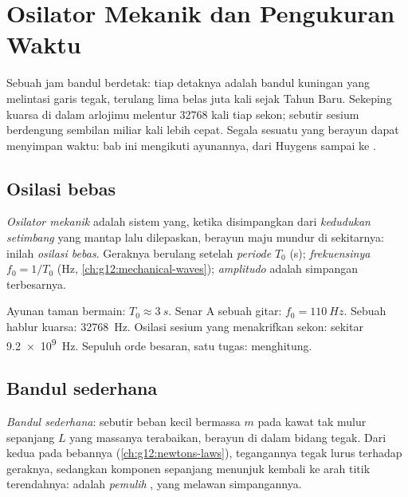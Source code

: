 \chapter{Osilator Mekanik dan Pengukuran Waktu}\label{ch:g12:oscillators-and-time}

Sebuah jam bandul berdetak: tiap detaknya adalah bandul kuningan yang
melintasi garis tegak, terulang lima belas juta kali sejak Tahun Baru.
Sekeping kuarsa di dalam arlojimu melentur \num{32768} kali tiap sekon;
sebutir  sesium berdengung sembilan miliar kali lebih cepat. Segala
sesuatu yang berayun dapat menyimpan waktu: bab ini mengikuti ayunannya,
dari Huygens sampai ke .

\section{Osilasi bebas}

\begin{definition}\label{def:g12:oscillators-and-time:oscillator}
\emph{Osilator mekanik} adalah sistem yang, ketika
disimpangkan dari \emph{kedudukan setimbang} yang mantap lalu dilepaskan, berayun maju mundur di sekitarnya:
inilah \emph{osilasi bebas}. Geraknya berulang
setelah \emph{periode} $T_0$ (\unit{s});
\emph{frekuensinya} $f_0 = 1/T_0$
(\unit{Hz}, \cref{ch:g12:mechanical-waves});
\emph{amplitudo} adalah simpangan terbesarnya.
\end{definition}

\begin{example}\label{ex:g12:oscillators-and-time:zoo}
Ayunan taman bermain: $T_0 \approx \qty{3}{s}$. Senar A sebuah gitar:
$f_0 = \qty{110}{Hz}$. Sebuah hablur kuarsa: \qty{32768}{Hz}. Osilasi
sesium yang menakrifkan sekon: sekitar \qty{9.2e9}{Hz}. Sepuluh orde
besaran, satu tugas: menghitung.
\end{example}

\section{Bandul sederhana}

\begin{definition}\label{def:g12:oscillators-and-time:pendulum}
\emph{Bandul sederhana}: sebutir beban kecil bermassa
$m$ pada kawat tak mulur sepanjang $L$ yang massanya terabaikan,
berayun di dalam bidang tegak. Dari kedua  pada bebannya
(\cref{ch:g12:newtons-laws}), tegangannya tegak lurus terhadap
geraknya, sedangkan komponen  sepanjang  menunjuk kembali
ke arah titik terendahnya:  adalah \emph{ pemulih}%
, yang melawan simpangannya.
\end{definition}

